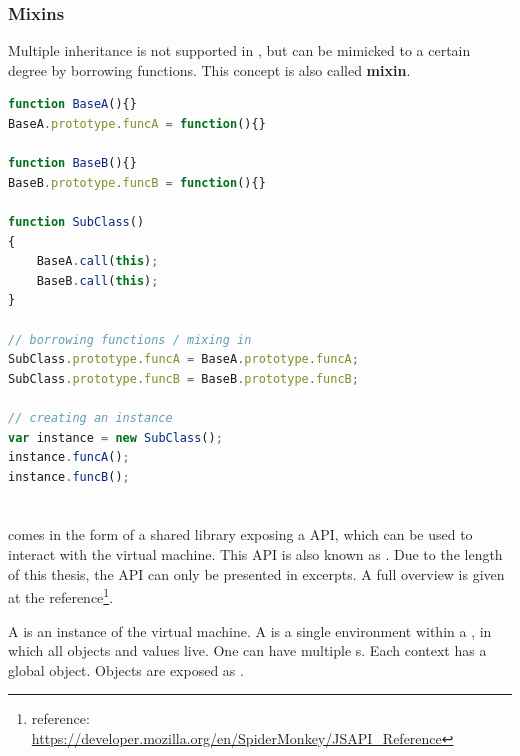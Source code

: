 \subsubsection{Mixins}
\label{sec:Mixins}

Multiple inheritance is not supported in , but can be mimicked to a certain degree by borrowing functions. This concept is also called \textbf{mixin}.

\SingleSpacing
\begin{lstlisting}[language=JavaScript, caption=Mixins in \myProperName{JavaScript}, label=JSMixins]
function BaseA(){}
BaseA.prototype.funcA = function(){}

function BaseB(){}
BaseB.prototype.funcB = function(){}

function SubClass()
{
	BaseA.call(this);
	BaseB.call(this);
}

// borrowing functions / mixing in
SubClass.prototype.funcA = BaseA.prototype.funcA;
SubClass.prototype.funcB = BaseB.prototype.funcB;

// creating an instance
var instance = new SubClass();
instance.funcA();
instance.funcB();
\end{lstlisting}
\OnehalfSpacing

\section{}

 comes in the form of a shared library exposing a  API, which can be used to interact with the  virtual machine. This API is also known as . Due to the length of this thesis, the API can only be presented in excerpts. A full overview is given at the  reference\footnote{ reference: \url{https://developer.mozilla.org/en/SpiderMonkey/JSAPI_Reference}}.

A  is an instance of the virtual machine. A  is a single environment within a , in which all objects and values live. One  can have multiple s. Each context has a global object. Objects are exposed as .

